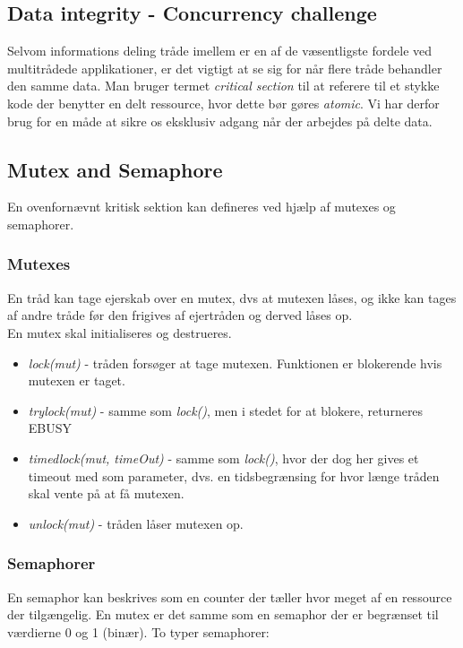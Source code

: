 \newpage

\subsection{Data integrity - Concurrency challenge}

Selvom informations deling tråde imellem er en af de væsentligste fordele ved multitrådede applikationer, er det vigtigt at se sig for når flere tråde behandler den samme data.
Man bruger termet \textit{critical section} til at referere til et stykke kode der benytter en delt ressource, hvor dette bør gøres \textit{atomic}. Vi har derfor brug for en måde at sikre os eksklusiv adgang når der arbejdes på delte data.

\subsection{Mutex and Semaphore}

En ovenfornævnt kritisk sektion kan defineres ved hjælp af mutexes og semaphorer.

\subsubsection{Mutexes}

En tråd kan tage ejerskab over en mutex, dvs at mutexen låses, og ikke kan tages af andre tråde før den frigives af ejertråden og derved låses op. \\

En mutex skal initialiseres og destrueres.

\begin{itemize}
	\item \textit{lock(mut)} - tråden forsøger at tage mutexen. Funktionen er blokerende hvis mutexen er taget.
	\item \textit{trylock(mut)} - samme som \textit{lock()}, men i stedet for at blokere, returneres EBUSY
	\item \textit{timedlock(mut, timeOut)} - samme som \textit{lock()}, hvor der dog her gives et timeout med som parameter, dvs. en tidsbegrænsing for hvor længe tråden skal vente på at få mutexen.
	\item \textit{unlock(mut)} - tråden låser mutexen op. 
\end{itemize}

\subsubsection{Semaphorer}
En semaphor kan beskrives som en counter der tæller hvor meget af en ressource der tilgængelig.
En mutex er det samme som en semaphor der er begrænset til værdierne 0 og 1 (binær).
To typer semaphorer:

